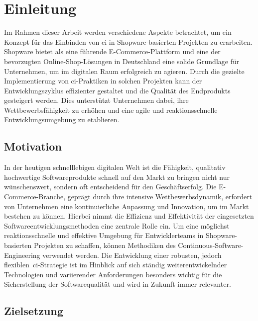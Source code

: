 
\section{Einleitung} \label{sec:01-introduction}

Im Rahmen dieser Arbeit werden verschiedene Aspekte betrachtet, um ein Konzept für das Einbinden von
\acrfull{ci} in Shopware-basierten Projekten zu erarbeiten.
Shopware bietet als eine führende E-Commerce-Plattform und eine der bevorzugten Online-Shop-Lösungen in
Deutschland eine solide Grundlage für Unternehmen, um im digitalen Raum
erfolgreich zu agieren.
Durch die gezielte Implementierung von \acrshort{ci}-Praktiken in solchen Projekten kann der Entwicklungszyklus
effizienter gestaltet und die Qualität des Endprodukts gesteigert werden.
Dies unterstützt Unternehmen dabei, ihre Wettbewerbsfähigkeit zu erhöhen und eine agile und reaktionsschnelle
Entwicklungsumgebung zu etablieren.

\subsection{Motivation} \label{subsec:01-introduction-1}

In der heutigen schnelllebigen digitalen Welt ist die Fähigkeit, qualitativ hochwertige Softwareprodukte schnell auf den
Markt zu bringen nicht nur wünschenswert, sondern oft entscheidend für den Geschäftserfolg.
Die E-Commerce-Branche, geprägt durch ihre intensive Wettbewerbsdynamik, erfordert von Unternehmen eine kontinuierliche
Anpassung und Innovation, um im Markt bestehen zu können.
Hierbei nimmt die Effizienz und Effektivität der eingesetzten Softwareentwicklungsmethoden eine zentrale Rolle ein.
Um eine möglichst reaktionsschnelle und effektive Umgebung für Entwicklerteams in Shopware-basierten Projekten zu
schaffen, können Methodiken des Continuous-Software-Engineering verwendet werden.
Die Entwicklung einer robusten, jedoch flexiblen\ \acrshort{ci}-Strategie ist im Hinblick auf sich ständig
weiterentwickelnder Technologien und variierender Anforderungen besonders wichtig für die Sicherstellung der
Softwarequalität und wird in Zukunft immer relevanter.

\subsection{Zielsetzung} \label{subsec:01-introduction-2}

